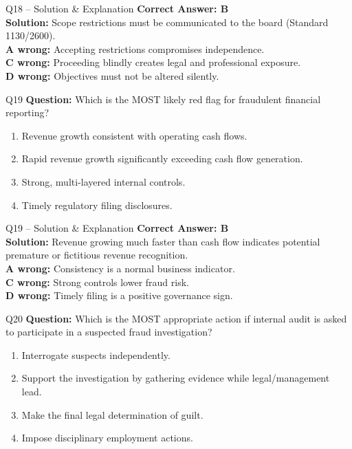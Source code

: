 \documentclass[aspectratio=169,10pt]{beamer}
\begin{document}
	\begin{frame}[t]{Q18 -- Solution \& Explanation}
		\small
		\textbf{Correct Answer: B} \\[4pt]
		\textbf{Solution:} Scope restrictions must be communicated to the board (Standard 1130/2600). \\[4pt]
		\textbf{A wrong:} Accepting restrictions compromises independence. \\[2pt]
		\textbf{C wrong:} Proceeding blindly creates legal and professional exposure. \\[2pt]
		\textbf{D wrong:} Objectives must not be altered silently.
	\end{frame}
	
	\begin{frame}[t]{Q19}
		\small
		\textbf{Question:} Which is the MOST likely red flag for fraudulent financial reporting?
		\begin{enumerate}[label=\Alph*.,itemsep=1pt,topsep=2pt]
			\item Revenue growth consistent with operating cash flows.
			\item Rapid revenue growth significantly exceeding cash flow generation.
			\item Strong, multi-layered internal controls.
			\item Timely regulatory filing disclosures.
		\end{enumerate}
	\end{frame}
	
	\begin{frame}[t]{Q19 -- Solution \& Explanation}
		\small
		\textbf{Correct Answer: B} \\[4pt]
		\textbf{Solution:} Revenue growing much faster than cash flow indicates potential premature or fictitious revenue recognition. \\[4pt]
		\textbf{A wrong:} Consistency is a normal business indicator. \\[2pt]
		\textbf{C wrong:} Strong controls lower fraud risk. \\[2pt]
		\textbf{D wrong:} Timely filing is a positive governance sign.
	\end{frame}
	
	\begin{frame}[t]{Q20}
		\small
		\textbf{Question:} Which is the MOST appropriate action if internal audit is asked to participate in a suspected fraud investigation?
		\begin{enumerate}[label=\Alph*.,itemsep=1pt,topsep=2pt]
			\item Interrogate suspects independently.
			\item Support the investigation by gathering evidence while legal/management lead.
			\item Make the final legal determination of guilt.
			\item Impose disciplinary employment actions.
		\end{enumerate}
	\end{frame}
	
\end{document}
